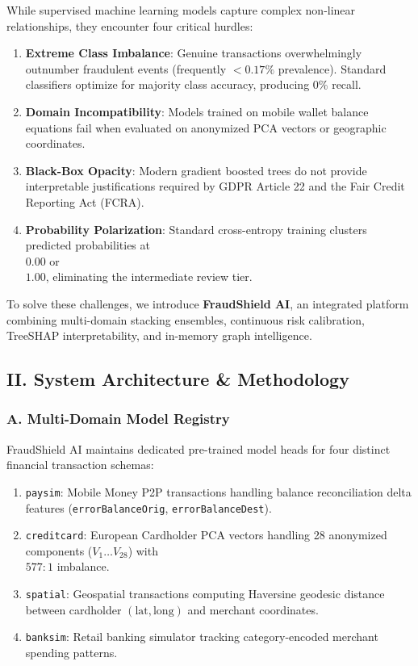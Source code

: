 \documentclass[12pt,a4paper,oneside]{report}
\begin{document}
While supervised machine learning models capture complex non-linear relationships, they encounter four critical hurdles:

\begin{enumerate}[leftmargin=0.35in]
\item \textbf{Extreme Class Imbalance}: Genuine transactions overwhelmingly outnumber fraudulent events (frequently $< 0.17\%$ prevalence). Standard classifiers optimize for majority class accuracy, producing 0\% recall.
\item \textbf{Domain Incompatibility}: Models trained on mobile wallet balance equations fail when evaluated on anonymized PCA vectors or geographic coordinates.
\item \textbf{Black-Box Opacity}: Modern gradient boosted trees do not provide interpretable justifications required by GDPR Article 22 and the Fair Credit Reporting Act (FCRA).
\item \textbf{Probability Polarization}: Standard cross-entropy training clusters predicted probabilities at \\$0.00$ or \\$1.00$, eliminating the intermediate review tier.
\end{enumerate}

To solve these challenges, we introduce \textbf{FraudShield AI}, an integrated platform combining multi-domain stacking ensembles, continuous risk calibration, TreeSHAP interpretability, and in-memory graph intelligence.



\subsection{II. System Architecture \& Methodology}

\subsubsection{A. Multi-Domain Model Registry}
FraudShield AI maintains dedicated pre-trained model heads for four distinct financial transaction schemas:

\begin{enumerate}[leftmargin=0.35in]
\item \texttt{paysim}: Mobile Money P2P transactions handling balance reconciliation delta features (\texttt{errorBalanceOrig}, \texttt{errorBalanceDest}).
\item \texttt{creditcard}: European Cardholder PCA vectors handling 28 anonymized components ($V_1 \dots V_{28}$) with \\$577:1$ imbalance.
\item \texttt{spatial}: Geospatial transactions computing Haversine geodesic distance between cardholder $(\text{lat}, \text{long})$ and merchant coordinates.
\item \texttt{banksim}: Retail banking simulator tracking category-encoded merchant spending patterns.
\end{enumerate}
\end{document}
